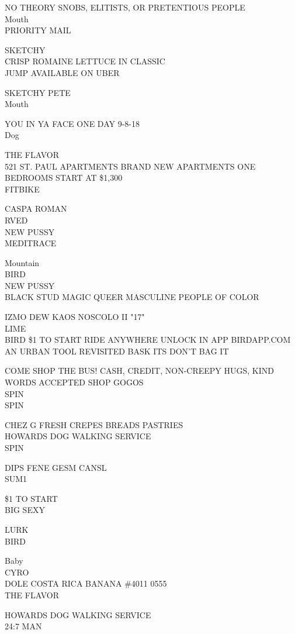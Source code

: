 \documentclass[10pt,letterpaper]{article}
\begin{document}
NO THEORY SNOBS, ELITISTS, OR PRETENTIOUS PEOPLE\\
Mouth\\
PRIORITY MAIL

SKETCHY\\
CRISP ROMAINE LETTUCE IN CLASSIC\\
JUMP AVAILABLE ON UBER

SKETCHY PETE\\
Mouth

YOU IN YA FACE ONE DAY 9{-}8{-}18\\
Dog

THE FLAVOR\\
521 ST. PAUL APARTMENTS BRAND NEW APARTMENTS ONE BEDROOMS START AT \$1,300\\
FITBIKE

CASPA ROMAN\\
RVED\\
NEW PUSSY\\
MEDITRACE

Mountain\\
BIRD\\
NEW PUSSY\\
BLACK STUD MAGIC QUEER MASCULINE PEOPLE OF COLOR

IZMO DEW KAOS NOSCOLO II "17"\\
LIME\\
BIRD \$1 TO START RIDE ANYWHERE UNLOCK IN APP BIRDAPP.COM\\
AN URBAN TOOL REVISITED BASK ITS DON'T BAG IT

COME SHOP THE BUS!  CASH, CREDIT, NON{-}CREEPY HUGS, KIND WORDS ACCEPTED SHOP GOGOS\\
SPIN\\
SPIN

CHEZ G FRESH CREPES BREADS PASTRIES\\
HOWARDS DOG WALKING SERVICE\\
SPIN

DIPS FENE GESM CANSL\\
SUM1

\$1 TO START\\
BIG SEXY

LURK\\
BIRD

Baby\\
CYRO\\
DOLE COSTA RICA BANANA \#4011 0555\\
THE FLAVOR

HOWARDS DOG WALKING SERVICE\\
24:7 MAN
\end{document}
